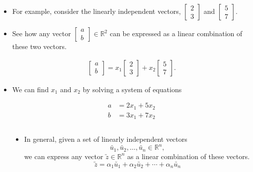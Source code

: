 \documentclass[10pt, aspectratio=169]{beamer}
\newcommand{\colvec}[2]{\begin{bmatrix} #1 \\ #2 \end{bmatrix}}
\begin{document}
\begin{frame}
\begin{itemize}
\item<1-> For example, consider the linearly independent vectors, $\colvec{2}{3}$ and $\colvec{5}{7}$. 

\item<2-> See how any vector $\colvec{a}{b} \in \mathbb{R}^2$ can be expressed as a linear combination of these two vectors.

\begin{gather*}
\colvec{a}{b} = x_1 \colvec{2}{3} + x_2 \colvec{5}{7}.
\end{gather*}

\item<3-> We can find $x_1$ and $x_2$ by solving a system of equations

\begin{align*}
a &= 2x_1 + 5x_2 \\
b &= 3x_1 + 7x_2
\end{align*}

\end{itemize}
\end{frame}


\begin{frame}
  \begin{columns}

    \begin{column}{0.5\textwidth}
      \centering
    \end{column}

    \begin{column}{0.5\textwidth}
      \begin{itemize}
        \item<1-> In general, given a set of linearly independent vectors $$\utilde{u_1}, \utilde{u_2}, \ldots, \utilde{u_n} \in \mathbb{R}^n,$$ we can express any vector $\utilde{z} \in \mathbb{R}^n$ as a linear combination of these vectors. 
        $$ \utilde{z} = \alpha_1 \utilde{u_1} + \alpha_2 \utilde{u_2} + \cdots + \alpha_n \utilde{u_n} $$
        \end{itemize}
    \end{column}

  \end{columns}
\end{frame}
\end{document}
